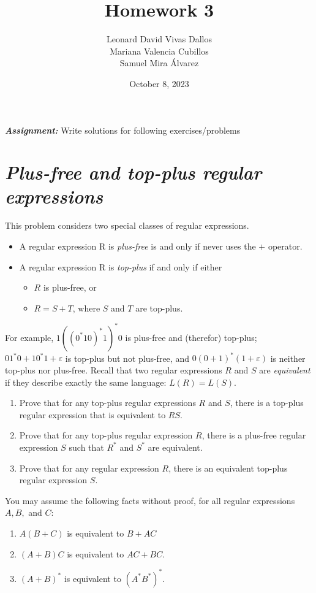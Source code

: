 \documentclass[12pt]{article}
\title{Homework 3}
\author{Leonard David Vivas Dallos \\ Mariana Valencia Cubillos \\ Samuel Mira Álvarez}
\date{October 8, 2023}
\begin{document}
\maketitle
\textbf{\textit{Assignment:}} Write solutions for following exercises/problems

\tableofcontents

\renewcommand{\thesubsection}{\thesection.\alph{subsection}}

\section{\textit{Plus-free and top-plus regular expressions}}

This problem considers two special classes of regular expressions.
\begin{itemize}
    \item A regular expression R is \textit{plus-free} is and only if never uses the $+$ operator.
    \item A regular expression R is \textit{top-plus} if and only if either
    \begin{itemize}
        \item $R$ is plus-free, or
        \item $R = S + T$, where $S$ and $T$ are top-plus.
    \end{itemize}
\end{itemize}
For example, $1((0^*10)^*1)^*0$ is plus-free and (therefor) top-plus; $01^*0+10^*1+\varepsilon$ is top-plus but not plus-free, and $0(0+1)^*(1+\varepsilon)$ is neither top-plus nor plus-free.
Recall that two regular expressions $R$ and $S$ are \textit{equivalent} if they describe exactly the same language: $L(R)=L(S)$.
\begin{enumerate}
[label=\alph*)]
    \item Prove that for any top-plus regular expressions $R$ and $S$, there is a top-plus regular expression that is equivalent to $RS$.
    \item Prove that for any top-plus regular expression $R$, there is a plus-free regular expression $S$ such that $R^*$ and $S^*$ are equivalent.
    \item Prove that for any regular expression $R$, there is an equivalent top-plus regular expression $S$.
\end{enumerate}
You may assume the following facts without proof, for all regular expressions $A, B,$ and $C$:
\begin{enumerate}
[label=\roman*)]
    \item $A(B+C)$ is equivalent to $B + AC$
    \item $(A+B)C$ is equivalent to $AC+BC$.
    \item $(A+B)^*$ is equivalent to $(A^*B^*)^*$.
\end{enumerate}
\end{document}
